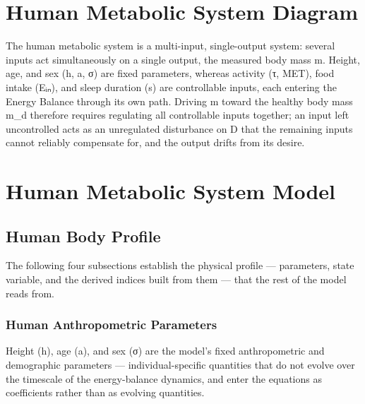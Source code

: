 
\section{Human Metabolic System Diagram}

The human metabolic system is a multi-input, single-output system: several inputs act simultaneously on a single output, the measured body mass m. Height, age, and sex (h, a, σ) are fixed parameters, whereas activity (τ, MET), food intake (Eᵢₙ), and sleep duration (s) are controllable inputs, each entering the Energy Balance through its own path. Driving m toward the healthy body mass m_d therefore requires regulating all controllable inputs together; an input left uncontrolled acts as an unregulated disturbance on D that the remaining inputs cannot reliably compensate for, and the output drifts from its desire.



\section{Human Metabolic System Model}

\subsection{Human Body Profile}

The following four subsections establish the physical profile — parameters, state variable, and the derived indices built from them — that the rest of the model reads from.

\subsubsection{Human Anthropometric Parameters}

Height (h), age (a), and sex (σ) are the model's fixed anthropometric and demographic parameters — individual-specific quantities that do not evolve over the timescale of the energy-balance dynamics, and enter the equations as coefficients rather than as evolving quantities.

